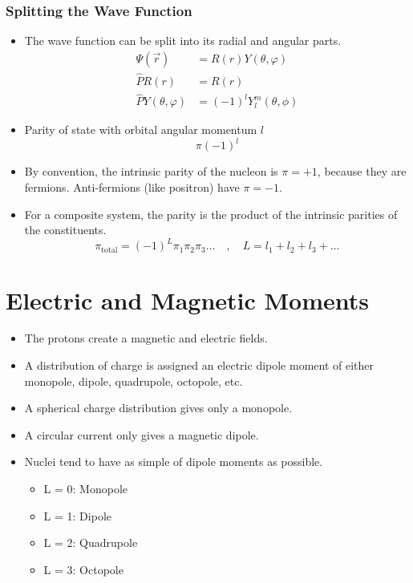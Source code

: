 \subsubsection{Splitting the Wave Function}
\begin{itemize}
    \item The wave function can be split into its radial and angular parts.
    \begin{align}
    Ψ(\vec{r}) &= R(r)Y(\theta, φ) \\
    \hat{P}R(r) &= R(r) \\
    \hat{P}Y(\theta, φ) &= (-1)^lY_{l}^{m}(θ, ϕ)
    \end{align} 
    \item Parity of state with orbital angular momentum $l$ 
    \begin{equation}
    π(-1)^{l}
    \end{equation} 
    \item By convention, the intrinsic parity of the nucleon is $π = +1$, because they are fermions. Anti-fermions (like positron) have $π = -1$.
    \item For a composite system, the parity is the product of the intrinsic parities of the constituents.
    \begin{equation}
      π_{\text{total}} = (-1)^{L}π_1π_2π_3 \ldots \quad , \quad  L = l_1 + l_2 + l_3 + \ldots
    \end{equation}
\end{itemize}

\section{Electric and Magnetic Moments}
\begin{itemize}
    \item The protons create a magnetic and electric fields. 
    \item A distribution of charge is assigned an electric dipole moment of either monopole, dipole, quadrupole, octopole, etc.
    \item A spherical charge distribution gives only a monopole. 
    \item A circular current only gives a magnetic dipole. 
    \item Nuclei tend to have as simple of dipole moments as possible. 
    \begin{itemize}
        \item L = 0: Monopole
        \item L = 1: Dipole
        \item L = 2: Quadrupole
        \item L = 3: Octopole
    \end{itemize}
\end{itemize}

